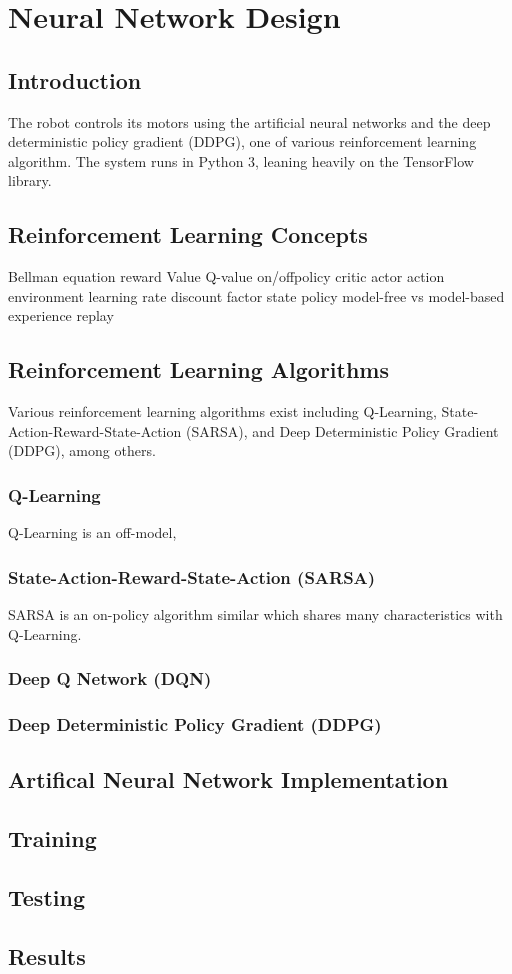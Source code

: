 \chapter{Neural Network Design}
\section{Introduction}
The robot controls its motors using the artificial neural networks and the deep deterministic policy gradient (DDPG), one of various reinforcement learning algorithm. The system runs in Python 3, leaning heavily on the TensorFlow library.

\section{Reinforcement Learning Concepts}
Bellman equation
reward
Value
Q-value
on/offpolicy
critic
actor
action
environment
learning rate
discount factor
state
policy
model-free vs model-based
experience replay

\section{Reinforcement Learning Algorithms}
Various reinforcement learning algorithms exist including Q-Learning, State-Action-Reward-State-Action (SARSA), and Deep Deterministic Policy Gradient (DDPG), among others.

\subsection{Q-Learning}
Q-Learning is an off-model, 

\subsection{State-Action-Reward-State-Action (SARSA)}
SARSA is an on-policy algorithm similar which shares many characteristics with Q-Learning.

\subsection{Deep Q Network (DQN)}


\subsection{Deep Deterministic Policy Gradient (DDPG)}





\section{Artifical Neural Network Implementation}

\section{Training}

\section{Testing}

\section{Results}

